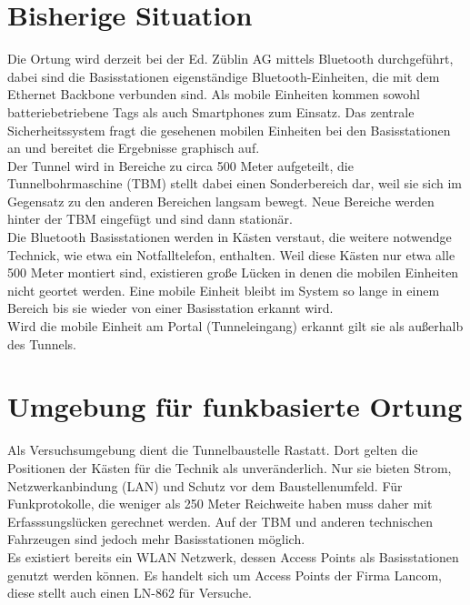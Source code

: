 \section{Bisherige Situation}
Die Ortung wird derzeit bei der Ed. Züblin AG mittels Bluetooth durchgeführt, dabei sind die Basisstationen eigenständige Bluetooth-Einheiten, die mit dem Ethernet Backbone verbunden sind.
Als mobile Einheiten kommen sowohl batteriebetriebene Tags als auch Smartphones zum Einsatz. 
Das zentrale Sicherheitssystem fragt die gesehenen mobilen Einheiten bei den Basisstationen an und bereitet die Ergebnisse graphisch auf.\\
Der Tunnel wird in Bereiche zu circa 500 Meter aufgeteilt, die Tunnelbohrmaschine (TBM) stellt dabei einen Sonderbereich dar, weil sie sich im Gegensatz zu den anderen Bereichen langsam bewegt. 
Neue Bereiche werden hinter der TBM eingefügt und sind dann stationär.\\
Die Bluetooth Basisstationen werden in Kästen verstaut, die weitere notwendge Technick, wie etwa ein Notfalltelefon, enthalten.
Weil diese Kästen nur etwa alle 500 Meter montiert sind, existieren große Lücken in denen die mobilen Einheiten nicht geortet werden.
Eine mobile Einheit bleibt im System so lange in einem Bereich bis sie wieder von einer Basisstation erkannt wird.\\
Wird die mobile Einheit am Portal (Tunneleingang) erkannt gilt sie als außerhalb des Tunnels.
 
\section{Umgebung für funkbasierte Ortung}
Als Versuchsumgebung dient die Tunnelbaustelle Rastatt.
Dort gelten die Positionen der Kästen für die Technik als  unveränderlich.
Nur sie bieten Strom, Netzwerkanbindung (LAN) und Schutz vor dem Baustellenumfeld.
Für Funkprotokolle, die weniger als 250 Meter Reichweite haben muss daher mit Erfasssungslücken gerechnet werden.
Auf der TBM und anderen technischen Fahrzeugen sind jedoch mehr Basisstationen möglich.\\
Es existiert bereits ein WLAN Netzwerk, dessen Access Points als Basisstationen genutzt werden können.
Es handelt sich um Access Points der Firma Lancom, diese stellt auch einen LN-862 für Versuche.


